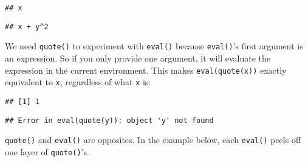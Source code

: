 \begin{Shaded}
\begin{Highlighting}[]
\end{Highlighting}
\end{Shaded}

\begin{verbatim}
## x
\end{verbatim}

\begin{Shaded}
\begin{Highlighting}[]
\OperatorTok{+}\StringTok{ }\OperatorTok{^}\NormalTok{)}
\end{Highlighting}
\end{Shaded}

\begin{verbatim}
## x + y^2
\end{verbatim}

We need \texttt{quote()} to experiment with \texttt{eval()} because
\texttt{eval()}'s first argument is an expression. So if you only
provide one argument, it will evaluate the expression in the current
environment. This makes \texttt{eval(quote(x))} exactly equivalent to
\texttt{x}, regardless of what \texttt{x} is:

\begin{Shaded}
\begin{Highlighting}[]
\NormalTok{(}\StringTok{ }\NormalTok{))}
\NormalTok{(}
\end{Highlighting}
\end{Shaded}

\begin{verbatim}
## [1] 1
\end{verbatim}

\begin{Shaded}
\begin{Highlighting}[]
\NormalTok{(}
\end{Highlighting}
\end{Shaded}

\begin{verbatim}
## Error in eval(quote(y)): object 'y' not found
\end{verbatim}

\texttt{quote()} and \texttt{eval()} are opposites. In the example
below, each \texttt{eval()} peels off one layer of \texttt{quote()}'s.

